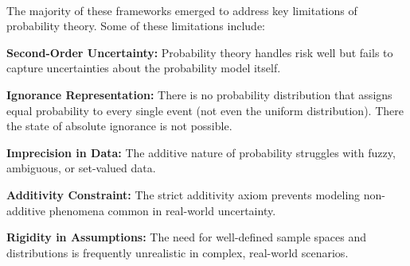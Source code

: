 \hspace{1cm}\cite{uncertaintymeasuresbigpicture}\\

The majority of these frameworks emerged to address key limitations of probability theory. Some of these limitations include:
\begin{romanenum}
      \item \textbf{Second-Order Uncertainty:} Probability theory handles risk well but fails to capture uncertainties about the probability model itself.
      \item \textbf{Ignorance Representation:} There is no probability distribution that assigns equal probability to every single event (not even the uniform distribution). There the state of absolute ignorance is not possible.
      \item \textbf{Imprecision in Data:} The additive nature of probability struggles with fuzzy, ambiguous, or set-valued data.
      \item \textbf{Additivity Constraint:} The strict additivity axiom prevents modeling non-additive phenomena common in real-world uncertainty.
      \item \textbf{Rigidity in Assumptions:} The need for well-defined sample spaces and distributions is frequently unrealistic in complex, real-world scenarios.
    \end{romanenum}
    




